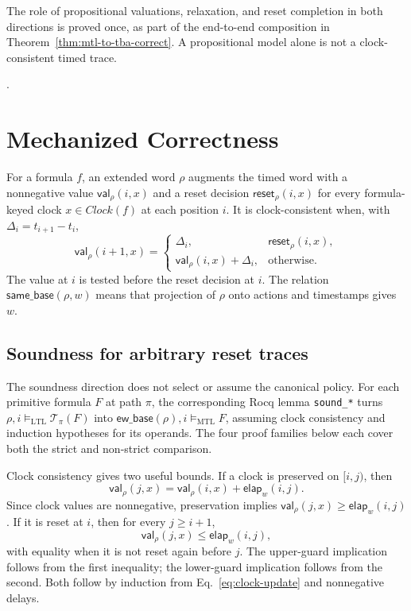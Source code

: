 \documentclass{ieeeaccess}
\newcommand{\T}{\mathcal{T}}
\newcommand{\CVal}{\mathsf{val}}
\newcommand{\CReset}{\mathsf{reset}}
\newcommand{\elapsed}{\mathsf{elap}}
\newcommand{\ewbase}{\mathsf{ew\_base}}
\newcommand{\Clock}{\mathit{Clock}}
\begin{document}
The role of propositional valuations, relaxation, and reset completion in
both directions is proved once, as part of the end-to-end composition in
Theorem~\ref{thm:mtl-to-tba-correct}. A propositional model alone is not a
clock-consistent timed trace.

\cite{openai_codex}.

\section{Mechanized Correctness}
\label{sec:correctness}
\label{sec:encoding-correctness}
For a formula $f$, an extended word $\rho$ augments the timed word with a
nonnegative value $\CVal_\rho(i,x)$ and a reset decision
$\CReset_\rho(i,x)$ for every formula-keyed clock $x\in\Clock(f)$ at each
position $i$. It is clock-consistent when, with
$\Delta_i=t_{i+1}-t_i$,
\begin{equation}
\CVal_\rho(i+1,x)=
\begin{cases}
\Delta_i,&\CReset_\rho(i,x),\\
\CVal_\rho(i,x)+\Delta_i,&\text{otherwise.}
\end{cases}
\label{eq:clock-update}
\end{equation}
The value at $i$ is tested before the reset decision at $i$. The relation
$\mathsf{same\_base}(\rho,w)$ means that projection of $\rho$ onto actions
and timestamps gives $w$.

\subsection{Soundness for arbitrary reset traces}
\label{subsec:primitive-soundness}
The soundness direction does not select or assume the canonical policy. For
each primitive formula $F$ at path $\pi$, the corresponding Rocq lemma
\texttt{sound\_*} turns $\rho,i\models_{\mathrm{LTL}}\T_\pi(F)$ into
$\ewbase(\rho),i\models_{\mathrm{MTL}}F$, assuming clock consistency and
induction hypotheses for its operands. The four proof families below each
cover both the strict and non-strict comparison.

Clock consistency gives two useful bounds. If a clock is preserved on
$[i,j)$, then
\[
\CVal_\rho(j,x)=\CVal_\rho(i,x)+\elapsed_w(i,j).
\]
Since clock values are nonnegative, preservation implies
$\CVal_\rho(j,x)\ge\elapsed_w(i,j)$. If it is reset at $i$, then for every
$j\ge i+1$,
\[
\CVal_\rho(j,x)\le\elapsed_w(i,j),
\]
with equality when it is not reset again before $j$. The upper-guard
implication follows from the first inequality; the lower-guard implication
follows from the second. Both follow by induction from
Eq.~\eqref{eq:clock-update} and nonnegative delays.
\end{document}
